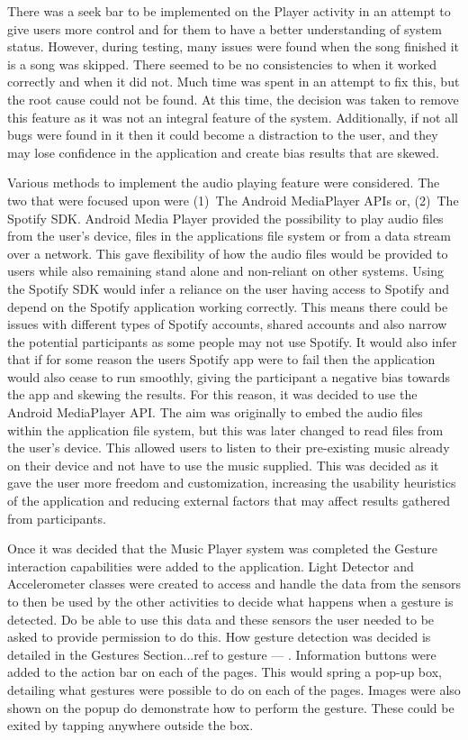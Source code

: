 \documentclass{l4proj}
\begin{document}
There was a seek bar to be implemented on the Player activity in an attempt to give users more control and for them to have a better understanding of system status. However, during testing, many issues were found when the song finished it is a song was skipped. There seemed to be no consistencies to when it worked correctly and when it did not. Much time was spent in an attempt to fix this, but the root cause could not be found. At this time, the decision was taken to remove this feature as it was not an integral feature of the system. Additionally, if not all bugs were found in it then it could become a distraction to the user, and they may lose confidence in the application and create bias results that are skewed.

Various methods to implement the audio playing feature were considered. The two that were focused upon were (1)~The Android MediaPlayer APIs or, (2)~The Spotify SDK. Android Media Player provided the possibility to play audio files from the user’s device, files in the applications file system or from a data stream over a network. This gave flexibility of how the audio files would be provided to users while also remaining stand alone and non-reliant on other systems. Using the Spotify SDK would infer a reliance on the user having access to Spotify and depend on the Spotify application working correctly. This means there could be issues with different types of Spotify accounts, shared accounts and also narrow the potential participants as some people may not use Spotify. It would also infer that if for some reason the users Spotify app were to fail then the application would also cease to run smoothly, giving the participant a negative bias towards the app and skewing the results. For this reason, it was decided to use the Android MediaPlayer API. The aim was originally to embed the audio files within the application file system, but this was later changed to read files from the user’s device. This allowed users to listen to their pre-existing music already on their device and not have to use the music supplied. This was decided as it gave the user more freedom and customization, increasing the usability heuristics of the application and reducing external factors that may affect results gathered from participants.

Once it was decided that the Music Player system was completed the Gesture interaction capabilities were added to the application. Light Detector and Accelerometer classes were created to access and handle the data from the sensors to then be used by the other activities to decide what happens when a gesture is detected. Do be able to use this data and these sensors the user needed to be asked to provide permission to do this. How gesture detection was decided is detailed in the Gestures Section...ref to gesture --- . Information buttons were added to the action bar on each of the pages. This would spring a pop-up box, detailing what gestures were possible to do on each of the pages. Images were also shown on the popup do demonstrate how to perform the gesture. These could be exited by tapping anywhere outside the box.
\end{document}
